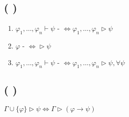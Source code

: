 \subsection{\textcyr{\CYRT\cyre\cyro\cyrr\cyre\cyrm\cyra} (\textcyr{\CYRO\cyrb}
\textcyr{\cyrerev\cyrk\cyrv\cyri\cyrv\cyra\cyrl\cyre\cyrn\cyrt\cyrn\cyro\cyrs\cyrt\cyri}
\textcyr{\cyrs\cyre\cyrk\cyrv\cyre\cyrn\cyrc\cyri\cyra\cyrl\cyrsftsn\cyrn\cyro\cyrg\cyro}
\textcyr{\cyri} \textcyr{\cyrg\cyri\cyrl\cyrsftsn\cyrb\cyre\cyrr\cyrt\cyro\cyrv\cyrs\cyrk\cyro\cyrg\cyro}
\textcyr{\cyri\cyrs\cyrch\cyri\cyrs\cyrl\cyre\cyrn\cyri\cyrishrt})}
\begin{enumerate}
\item $\varphi_{1},\dots,\varphi_{n}\vdash\psi$ - \textcyr{\cyrd\cyro\cyrk\cyra\cyrz\cyru\cyre\cyrm\cyra}
$\Leftrightarrow\varphi_{1},\dots,\varphi_{n}\vartriangleright\psi$
\item $\varphi$ - \textcyr{\cyrd\cyro\cyrk\cyra\cyrz\cyru\cyre\cyrm\cyra}
$\Leftrightarrow\vartriangleright\psi$
\item $\varphi_{1},\dots,\varphi_{n}\vdash\psi$ - \textcyr{\cyrd\cyro\cyrk\cyra\cyrz\cyru\cyre\cyrm\cyra}
$\Leftrightarrow\varphi_{1},\dots,\varphi_{n}\vartriangleright\psi,\forall\psi$
\end{enumerate}

\subsection{\textcyr{\CYRT\cyre\cyro\cyrr\cyre\cyrm\cyra} (\textcyr{\CYRO} \textcyr{\cyrd\cyre\cyrd\cyru\cyrk\cyrc\cyri\cyri})}

$\Gamma\cup\{\varphi\}\vartriangleright\psi\Leftrightarrow\Gamma\vartriangleright(\varphi\rightarrow\psi)$%

